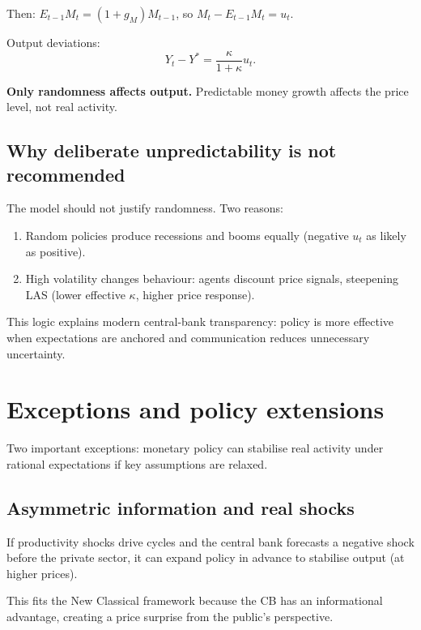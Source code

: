 \documentclass[
  letterpaper,
  DIV=11,
  numbers=noendperiod]{scrartcl}
\providecommand{\tightlist}{%
  \setlength{\itemsep}{0pt}\setlength{\parskip}{0pt}}
\begin{document}
Then: \(E_{t-1}M_t = (1 + g_M)M_{t-1}\), so \(M_t - E_{t-1}M_t = u_t\).

Output deviations: \[Y_t - Y^* = \frac{\kappa}{1+\kappa}u_t.\]

\textbf{Only randomness affects output.} Predictable money growth
affects the price level, not real activity.

\subsection{Why deliberate unpredictability is not
recommended}\label{why-deliberate-unpredictability-is-not-recommended}

The model should not justify randomness. Two reasons:

\begin{enumerate}
\def\labelenumi{\arabic{enumi}.}
\tightlist
\item
  Random policies produce recessions and booms equally (negative \(u_t\)
  as likely as positive).
\item
  High volatility changes behaviour: agents discount price signals,
  steepening LAS (lower effective \(\kappa\), higher price response).
\end{enumerate}

This logic explains modern central-bank transparency: policy is more
effective when expectations are anchored and communication reduces
unnecessary uncertainty.

\section{Exceptions and policy
extensions}\label{exceptions-and-policy-extensions}

Two important exceptions: monetary policy can stabilise real activity
under rational expectations if key assumptions are relaxed.

\subsection{Asymmetric information and real
shocks}\label{asymmetric-information-and-real-shocks}

If productivity shocks drive cycles and the central bank forecasts a
negative shock before the private sector, it can expand policy in
advance to stabilise output (at higher prices).

This fits the New Classical framework because the CB has an
informational advantage, creating a price surprise from the public's
perspective.
\end{document}
